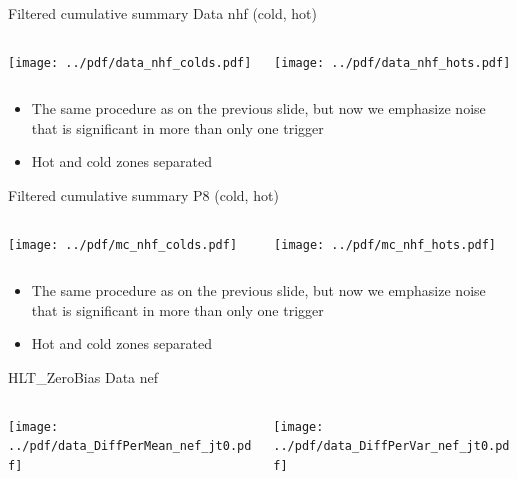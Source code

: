\documentclass[9pt]{beamer}
\begin{document}
\begin{frame}[t]{Filtered cumulative summary Data nhf (cold, hot)}
\begin{columns}[T]
  \begin{column}{.5\textwidth}
  \texttt{[image: ../pdf/data\_nhf\_colds.pdf]}
  \end{column}
  \begin{column}{.5\textwidth}
  \texttt{[image: ../pdf/data\_nhf\_hots.pdf]}
  \end{column}
\end{columns}
\begin{itemize}
 \item The same procedure as on the previous slide, but now we emphasize noise that is significant in more than only one trigger
 \item Hot and cold zones separated
\end{itemize}
\end{frame}

\begin{frame}[t]{Filtered cumulative summary P8 (cold, hot)}
\begin{columns}[T]
  \begin{column}{.5\textwidth}
  \texttt{[image: ../pdf/mc\_nhf\_colds.pdf]}
  \end{column}
  \begin{column}{.5\textwidth}
  \texttt{[image: ../pdf/mc\_nhf\_hots.pdf]}
  \end{column}
\end{columns}
\begin{itemize}
 \item The same procedure as on the previous slide, but now we emphasize noise that is significant in more than only one trigger
 \item Hot and cold zones separated
\end{itemize}
\end{frame}


\begin{frame}[t]{HLT\_ZeroBias Data nef}
\begin{columns}[T]
  \begin{column}{.5\textwidth}
  \texttt{[image: ../pdf/data\_DiffPerMean\_nef\_jt0.pdf]}
  \end{column}
  \begin{column}{.5\textwidth}
  \texttt{[image: ../pdf/data\_DiffPerVar\_nef\_jt0.pdf]}
  \end{column}
\end{columns}
\end{frame}
\end{document}
